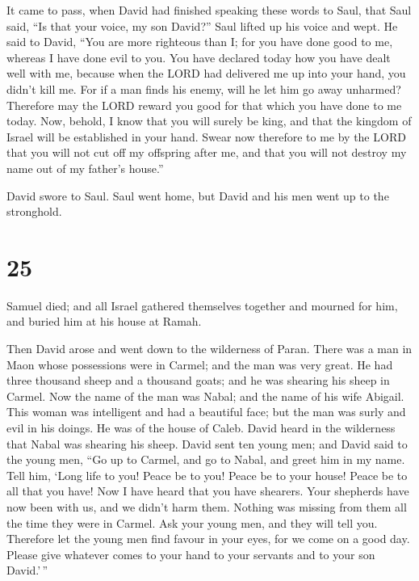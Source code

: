 It came to pass, when David had finished speaking these
words to Saul, that Saul said, ``Is that your voice, my son David?''
Saul lifted up his voice and wept.  He said to David,
``You are more righteous than I; for you have done good to me, whereas I
have done evil to you.  You have declared today how you
have dealt well with me, because when the LORD had delivered me up into
your hand, you didn't kill me.  For if a man finds his
enemy, will he let him go away unharmed? Therefore may the LORD reward
you good for that which you have done to me today.  Now,
behold, I know that you will surely be king, and that the kingdom of
Israel will be established in your hand.  Swear now
therefore to me by the LORD that you will not cut off my offspring after
me, and that you will not destroy my name out of my father's house.''

 David swore to Saul. Saul went home, but David and his
men went up to the stronghold.

\hypertarget{section-24}{%
\section{25}\label{section-24}}

 Samuel died; and all Israel gathered themselves together
and mourned for him, and buried him at his house at Ramah.

Then David arose and went down to the wilderness of Paran.
 There was a man in Maon whose possessions were in Carmel;
and the man was very great. He had three thousand sheep and a thousand
goats; and he was shearing his sheep in Carmel.  Now the
name of the man was Nabal; and the name of his wife Abigail. This woman
was intelligent and had a beautiful face; but the man was surly and evil
in his doings. He was of the house of Caleb.  David heard
in the wilderness that Nabal was shearing his sheep. 
David sent ten young men; and David said to the young men, ``Go up to
Carmel, and go to Nabal, and greet him in my name.  Tell
him, `Long life to you! Peace be to you! Peace be to your house! Peace
be to all that you have!  Now I have heard that you have
shearers. Your shepherds have now been with us, and we didn't harm them.
Nothing was missing from them all the time they were in Carmel.
 Ask your young men, and they will tell you. Therefore let
the young men find favour in your eyes, for we come on a good day.
Please give whatever comes to your hand to your servants and to your son
David.'\,''

